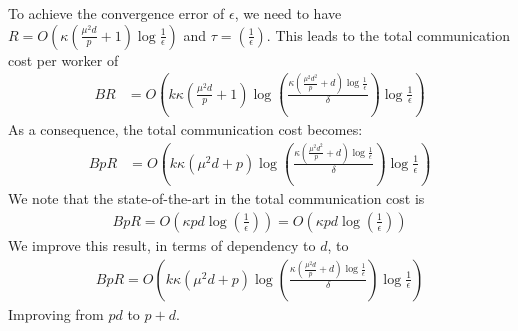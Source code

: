 {\begin{corollary}
To achieve the convergence error of $\epsilon$, we need to have $R=O\left(\kappa(\frac{\mu^2d}{p}+1)\log\frac{1}{\epsilon}\right)$ and $\tau=\left(\frac{1}{\epsilon}\right)$. This leads to the total communication cost per worker of 
\begin{align}
BR&=O\left(k\kappa(\frac{\mu^2d}{p}+1)\log\left(\frac{\kappa(\frac{\mu^2d^2}{p}+d)\log\frac{1}{\epsilon}}{\delta}\right)\log\frac{1}{\epsilon} \right)
\end{align}
As a consequence, the total communication cost becomes:
\begin{align}
BpR&=O\left(k\kappa(\mu^2d+p)\log\left(\frac{\kappa(\frac{\mu^2d^2}{p}+d)\log\frac{1}{\epsilon}}{\delta}\right)\log\frac{1}{\epsilon} \right)
\end{align}
We note that the state-of-the-art in \cite{karimireddy2019scaffold} the total communication cost is 
\begin{align}
    BpR=O\left(\kappa pd\log\left(\frac{1}{\epsilon}\right) \right)=O\left(\kappa pd\log\left(\frac{1}{\epsilon}\right)\right) 
\end{align}
We improve this result, in terms of dependency to $d$, to 
\begin{align}
    BpR=O\left(k\kappa(\mu^2d+p)\log\left(\frac{\kappa(\frac{\mu^2d}{p}+d)\log\frac{1}{\epsilon}}{\delta}\right)\log\frac{1}{\epsilon} \right)
\end{align}
Improving from $pd$ to $p+d$.
\end{corollary}

}

